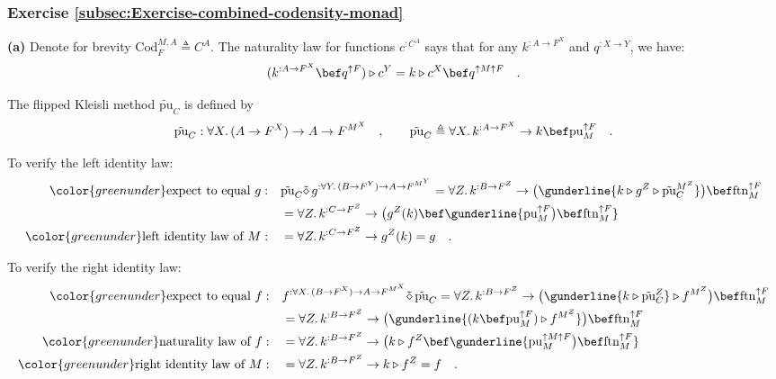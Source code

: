 \subsubsection*{Exercise \ref{subsec:Exercise-combined-codensity-monad}}

\textbf{(a)} Denote for brevity $\text{Cod}_{F}^{M,A}\triangleq C^{A}$.
The naturality law for functions $c^{:C^{A}}$ says that for any $k^{:A\rightarrow F^{X}}$
and $q^{:X\rightarrow Y}$, we have:
\[
(k^{:A\rightarrow F^{X}}\bef q^{\uparrow F})\triangleright c^{Y}=k\triangleright c^{X}\bef q^{\uparrow M\uparrow F}\quad.
\]

The flipped Kleisli method $\tilde{\text{pu}}_{C}$ is defined by
\[
\tilde{\text{pu}}_{C}:\forall X.\,(A\rightarrow F^{X})\rightarrow A\rightarrow F^{M^{X}}\quad,\quad\quad\tilde{\text{pu}}_{C}\triangleq\forall X.\,k^{:A\rightarrow F^{X}}\rightarrow k\bef\text{pu}_{M}^{\uparrow F}\quad.
\]

To verify the left identity law:
\begin{align*}
{\color{greenunder}\text{expect to equal }g:}\quad & \tilde{\text{pu}}_{C}\tilde{\diamond}\,g^{:\forall Y.\,(B\rightarrow F^{Y})\rightarrow A\rightarrow F^{M^{Y}}}=\forall Z.\,k^{:B\rightarrow F^{Z}}\rightarrow\big(\gunderline{k\triangleright g^{Z}\triangleright\tilde{\text{pu}}_{C}^{M^{Z}}}\big)\bef\text{ftn}_{M}^{\uparrow F}\\
 & =\forall Z.\,k^{:C\rightarrow F^{Z}}\rightarrow\big(g^{Z}(k)\bef\gunderline{\text{pu}_{M}^{\uparrow F}\big)\bef\text{ftn}_{M}^{\uparrow F}}\\
{\color{greenunder}\text{left identity law of }M:}\quad & =\forall Z.\,k^{:C\rightarrow F^{Z}}\rightarrow g^{Z}(k)=g\quad.
\end{align*}

To verify the right identity law:
\begin{align*}
{\color{greenunder}\text{expect to equal }f:}\quad & f^{:\forall X.\,(B\rightarrow F^{X})\rightarrow A\rightarrow F^{M^{X}}}\tilde{\diamond}\,\tilde{\text{pu}}_{C}=\forall Z.\,k^{:B\rightarrow F^{Z}}\rightarrow\big(\gunderline{k\triangleright\tilde{\text{pu}}_{C}^{Z}}\triangleright f^{M^{Z}}\big)\bef\text{ftn}_{M}^{\uparrow F}\\
 & =\forall Z.\,k^{:B\rightarrow F^{Z}}\rightarrow\big(\gunderline{(k\bef\text{pu}_{M}^{\uparrow F})\triangleright f^{M^{Z}}}\big)\bef\text{ftn}_{M}^{\uparrow F}\\
{\color{greenunder}\text{naturality law of }f:}\quad & =\forall Z.\,k^{:B\rightarrow F^{Z}}\rightarrow\big(k\triangleright f^{Z}\bef\gunderline{\text{pu}_{M}^{\uparrow M\uparrow F}\big)\bef\text{ftn}_{M}^{\uparrow F}}\\
{\color{greenunder}\text{right identity law of }M:}\quad & =\forall Z.\,k^{:B\rightarrow F^{Z}}\rightarrow k\triangleright f^{Z}=f\quad.
\end{align*}

